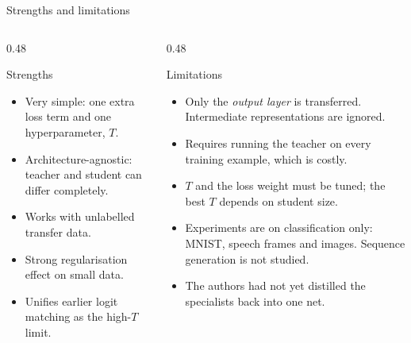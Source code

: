 \documentclass[aspectratio=169,11pt]{beamer}
\begin{document}
\begin{frame}{Strengths and limitations}
  \begin{columns}[T]
    \begin{column}{0.48\textwidth}
      \begin{exampleblock}{Strengths}
        \small
        \begin{itemize}
          \item Very simple: one extra loss term and one hyperparameter, $T$.
          \item Architecture-agnostic: teacher and student can differ completely.
          \item Works with unlabelled transfer data.
          \item Strong regularisation effect on small data.
          \item Unifies earlier logit matching as the high-$T$ limit.
        \end{itemize}
      \end{exampleblock}
    \end{column}
    \begin{column}{0.48\textwidth}
      \begin{alertblock}{Limitations}
        \small
        \begin{itemize}
          \item Only the \emph{output layer} is transferred. Intermediate representations are ignored.
          \item Requires running the teacher on every training example, which is costly.
          \item $T$ and the loss weight must be tuned; the best $T$ depends on student size.
          \item Experiments are on classification only: MNIST, speech frames and images. Sequence generation is not studied.
          \item The authors had not yet distilled the specialists back into one net.
        \end{itemize}
      \end{alertblock}
    \end{column}
  \end{columns}
\end{frame}
\end{document}
